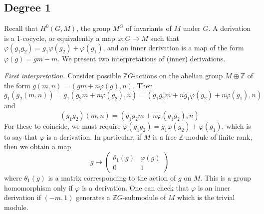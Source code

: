 \subsection{Degree 1}
Recall that \( H^0(G, M) \), the group \( M^G \) of invariants of \( M \) under \( G \).
A derivation is a 1-cocycle, or equivalently a map \( \varphi : G \to M \) such that \( \varphi(g_1 g_2) = g_1 \varphi(g_2) + \varphi(g_1) \), and an inner derivation is a map of the form \( \varphi(g) = gm - m \).
We present two interpretations of (inner) derivations.

\emph{First interpretation.}
Consider possible \( \mathbb Z G \)-actions on the abelian group \( M \oplus \mathbb Z \) of the form \( g(m, n) = (gm + n \varphi(g), n) \).
Then
\[ g_1(g_2(m, n)) = g_1(g_2 m + n \varphi(g_2), n) = (g_1 g_2 m + n g_1 \varphi(g_2) + n \varphi(g_1), n) \]
and
\[ (g_1 g_2)(m, n) = (g_1 g_2 m + n \varphi(g_1 g_2), n) \]
For these to coincide, we must require \( \varphi(g_1 g_2) = g_1 \varphi(g_2) + \varphi(g_1) \), which is to say that \( \varphi \) is a derivation.
In particular, if \( M \) is a free \( \mathbb Z \)-module of finite rank, then we obtain a map
\[ g \mapsto \begin{pmatrix}
    \theta_1(g) & \varphi(g) \\
    0 & 1
\end{pmatrix} \]
where \( \theta_1(g) \) is a matrix corresponding to the action of \( g \) on \( M \).
This is a group homomorphism only if \( \varphi \) is a derivation.
One can check that \( \varphi \) is an inner derivation if \( (-m, 1) \) generates a \( \mathbb Z G \)-submodule of \( M \) which is the trivial module.

